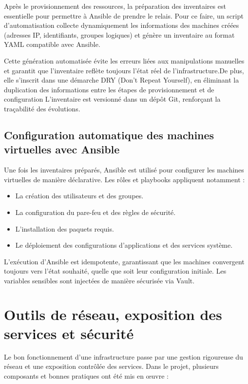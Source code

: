 Après le provisionnement des ressources, la préparation des inventaires est essentielle pour permettre à Ansible de prendre le relais.
Pour ce faire, un script d'automatisation collecte dynamiquement les informations des machines créées (adresses IP, identifiants, groupes logiques) et génère un inventaire au format YAML compatible avec Ansible.

Cette génération automatisée évite les erreurs liées aux manipulations manuelles et garantit que l'inventaire reflète toujours l'état réel de l'infrastructure.De plus, elle s’inscrit dans une démarche DRY (Don’t Repeat Yourself), en éliminant la duplication des informations entre les étapes de provisionnement et de configuration
L'inventaire est versionné dans un dépôt Git, renforçant la traçabilité des évolutions.

\subsection{Configuration automatique des machines virtuelles avec Ansible}

Une fois les inventaires préparés, Ansible est utilisé pour configurer les machines virtuelles de manière déclarative.
Les rôles et playbooks appliquent notamment :
\begin{itemize}
	\item La création des utilisateurs et des groupes.
	\item La configuration du pare-feu et des règles de sécurité.
	\item L'installation des paquets requis.
	\item Le déploiement des configurations d’applications et des services système.
\end{itemize}

L'exécution d'Ansible est idempotente, garantissant que les machines convergent toujours vers l'état souhaité, quelle que soit leur configuration initiale.
Les variables sensibles sont injectées de manière sécurisée via Vault.

\section{Outils de réseau, exposition des services et sécurité}

Le bon fonctionnement d'une infrastructure passe par une gestion rigoureuse du réseau et une exposition contrôlée des services.
Dans le projet, plusieurs composants et bonnes pratiques ont été mis en œuvre :

